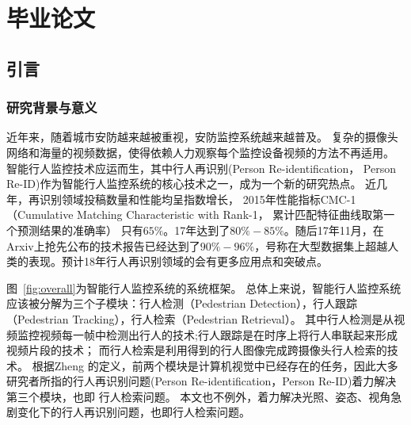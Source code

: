

%
\part{毕业论文}

\chapter{引言}

\section{研究背景与意义}

近年来，随着城市安防越来越被重视，安防监控系统越来越普及。
复杂的摄像头网络和海量的视频数据，使得依赖人力观察每个监控设备视频的方法不再适用。
智能行人监控技术应运而生，其中行人再识别(Person Re-identification， Person Re-ID)作为智能行人监控系统的核心技术之一，成为一个新的研究热点。
近几年，再识别领域投稿数量和性能均呈指数增长，
2015年性能指标CMC-1（Cumulative Matching Characteristic with Rank-1， 累计匹配特征曲线取第一个预测结果的准确率）
只有$65\%$。17年达到了$80\%-85\%$。随后17年11月，在Arxiv上抢先公布的技术报告已经达到了$90\%-96\%$，号称在大型数据集上超越人类的表现。预计18年行人再识别领域的会有更多应用点和突破点。

图~\ref{fig:overall}为智能行人监控系统的系统框架。
总体上来说，智能行人监控系统应该被分解为三个子模块：行人检测（Pedestrian Detection），行人跟踪（Pedestrian Tracking），行人检索（Pedestrian Retrieval）。
其中行人检测是从视频监控视频每一帧中检测出行人的技术;行人跟踪是在时序上将行人串联起来形成视频片段的技术；
而行人检索是利用得到的行人图像完成跨摄像头行人检索的技术。
根据Zheng \etal \cite{zheng2017person}的定义，前两个模块是计算机视觉中已经存在的任务，因此大多研究者所指的行人再识别问题(Person Re-identification，Person Re-ID)着力解决第三个模块，也即
行人检索问题。
本文也不例外，着力解决光照、姿态、视角急剧变化下的行人再识别问题，也即行人检索问题。

